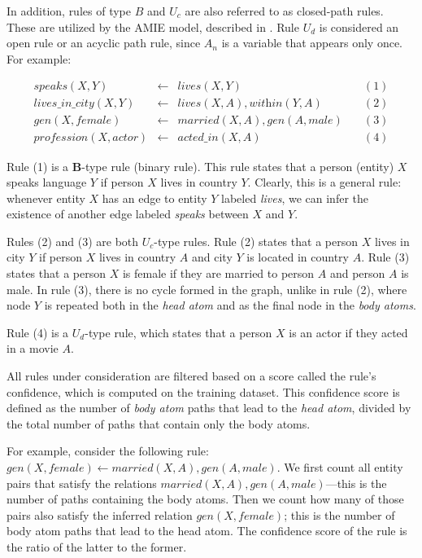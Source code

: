 In addition, rules of type \(B\) and \(U_c\) are also referred to as closed-path rules. These are utilized by the AMIE model, described in \cite{AMIE,galarraga2015fast}. Rule \(U_d\) is considered an open rule or an acyclic path rule, since \(A_n\) is a variable that appears only once. For example:



\begin{equation*}
\begin{matrix}
	\textit{speaks}(X, Y ) & \gets & \textit{lives}(X, Y) & \quad (1) \\
	\textit{lives\_in\_city}(X, Y ) & \gets & \textit{lives}(X, A),\textit{within}(Y, A)  & \quad  (2) \\
	\textit{gen}(X, female) & \gets & \textit{married}(X, A), \textit{gen}(A, male)  & \quad  (3) \\
	\textit{profession}(X, actor) &  \gets & \textit{acted\_in}(X, A)  & \quad (4)
\end{matrix}
\end{equation*}


Rule (1) is a \textbf{B}-type rule (binary rule). This rule states that a person (entity) \(X\) speaks language \(Y\) if person \(X\) lives in country \(Y\). Clearly, this is a general rule: whenever entity \(X\) has an edge to entity \(Y\) labeled \textit{lives}, we can infer the existence of another edge labeled \textit{speaks} between \(X\) and \(Y\).

Rules (2) and (3) are both \(U_c\)-type rules. Rule (2) states that a person \(X\) lives in city \(Y\) if person \(X\) lives in country \(A\) and city \(Y\) is located in country \(A\). Rule (3) states that a person \(X\) is female if they are married to person \(A\) and person \(A\) is male. In rule (3), there is no cycle formed in the graph, unlike in rule (2), where node \(Y\) is repeated both in the \textit{head atom} and as the final node in the \textit{body atoms}.

Rule (4) is a \(U_d\)-type rule, which states that a person \(X\) is an actor if they acted in a movie \(A\).

All rules under consideration are filtered based on a score called the rule's confidence, which is computed on the training dataset. This confidence score is defined as the number of \textit{body atom} paths that lead to the \textit{head atom}, divided by the total number of paths that contain only the body atoms.

For example, consider the following rule:  
\(\textit{gen}(X, female) \gets \textit{married}(X, A), \textit{gen}(A, male)\).  
We first count all entity pairs that satisfy the relations \(\textit{married}(X, A), \textit{gen}(A, male)\)—this is the number of paths containing the body atoms. Then we count how many of those pairs also satisfy the inferred relation \(\textit{gen}(X, female)\); this is the number of body atom paths that lead to the head atom. The confidence score of the rule is the ratio of the latter to the former.

